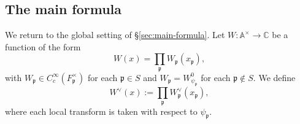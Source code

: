 \documentclass[reqno]{amsart}
\theoremstyle{plain}
\theoremstyle{definition}
\theoremstyle{itplain}
\numberwithin{equation}{section}
\numberwithin{theorem}{section}
\begin{document}
\subsection{The main formula}\label{sec:line-formula}
We return to the global setting of \S\ref{sec:main-formula}.  Let $W : \mathbb{A}^\times \rightarrow \mathbb{C}$ be a function of the form
\begin{equation*}
  W(x) = \prod_{\mathfrak{p}} W_{\mathfrak{p}}(x_{\mathfrak{p}}),
\end{equation*}
with $W_{\mathfrak{p}} \in C_c^\infty(F_{\mathfrak{p}}^\times)$ for each $\mathfrak{p} \in S$ and $W_{\mathfrak{p}} = W_{\psi_\mathfrak{p}}^0$ for each $\mathfrak{p} \notin S$.  We define
\begin{equation*}
  W^\vee(x) := \prod_{\mathfrak{p}} W_{\mathfrak{p}}^\vee(x_{\mathfrak{p}}),
\end{equation*}
where each local transform is taken with respect to $\psi_{\mathfrak{p}}$.
\end{document}
